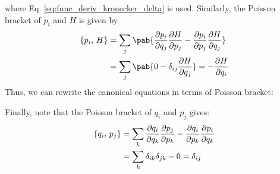 where Eq. \eqref{eq:func_deriv_kronecker_delta} is used.
Similarly, the Poisson bracket of $p_i$ and $H$ is given by
\begin{align}
  \pobra{p_i}{H} & = \sum_j \pab{\pdv{p_i}{q_j} \pdv{H}{p_j} - \pdv{p_i}{p_j} \pdv{H}{q_j}} \\
                 & = \sum_j \pab{0 - \delta_{ij} \pdv{H}{q_j}} = - \pdv{H}{q_i}
\end{align}
Thus, we can rewrite the canonical equations in terms of Poisson bracket:

Finally, note that the Poisson bracket of $q_i$ and $p_j$ gives:
\begin{align}
  \left\lbrace q_i ,\, p_j \right\rbrace & = \sum_k \pdv{q_i}{q_k} \pdv{p_j}{p_k} - \pdv{q_i}{p_k} \pdv{p_i}{q_k} \\
                   & = \sum_k \delta_{ik} \delta_{jk} - 0 = \delta_{ij}
\end{align}

